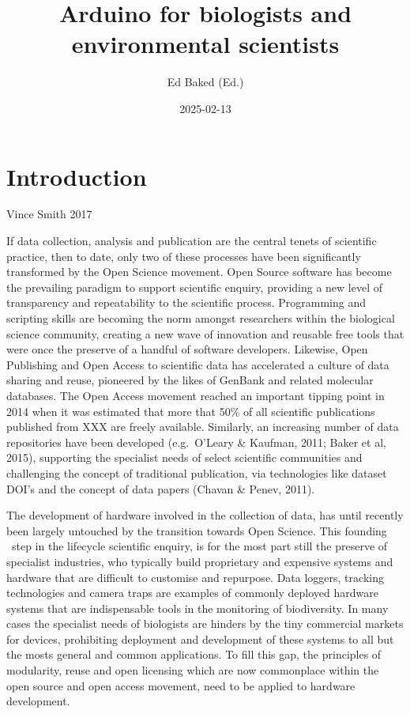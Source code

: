 \documentclass[
]{book}
\title{Arduino for biologists and environmental scientists}
\author{Ed Baked (Ed.)}
\date{2025-02-13}
\begin{document}
\maketitle

{
\setcounter{tocdepth}{1}
\tableofcontents
}
\chapter*{Introduction}\label{introduction}

Vince Smith 2017

If data collection, analysis and publication are the central tenets of scientific practice, then to date, only two of these processes have been significantly transformed by the Open Science movement. Open Source software has become the prevailing paradigm to support scientific enquiry, providing a new level of transparency and repeatability to the scientific process. Programming and scripting skills are becoming the norm amongst researchers within the biological science community, creating a new wave of innovation and reusable free tools that were once the preserve of a handful of software developers. Likewise, Open Publishing and Open Access to scientific data has accelerated a culture of data sharing and reuse, pioneered by the likes of GenBank and related molecular databases. The Open Access movement reached an important tipping point in 2014 when it was estimated that more that 50\% of all scientific publications published from XXX are freely available. Similarly, an increasing number of data repositories have been developed (e.g.~O'Leary \& Kaufman, 2011; Baker et al, 2015), supporting the specialist needs of select scientific communities and challenging the concept of traditional publication, via technologies like dataset DOI's and the concept of data papers (Chavan \& Penev, 2011).

The development of hardware involved in the collection of data, has until recently been largely untouched by the transition towards Open Science. This founding ~step in the lifecycle scientific enquiry, is for the most part still the preserve of specialist industries, who typically build proprietary and expensive systems and hardware that are difficult to customise and repurpose. Data loggers, tracking technologies and camera traps are examples of commonly deployed hardware systems that are indispensable tools in the monitoring of biodiversity. In many cases the specialist needs of biologists are hinders by the tiny commercial markets for devices, prohibiting deployment and development of these systems to all but the mosts general and common applications. To fill this gap, the principles of modularity, reuse and open licensing which are now commonplace within the open source and open access movement, need to be applied to hardware development.
\end{document}

